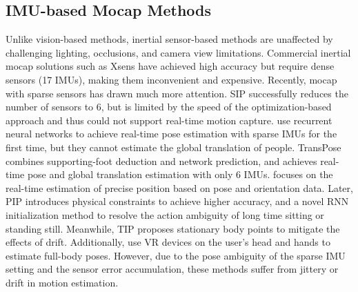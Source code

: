 \documentclass[sigconf,nonacm=true]{acmart}
\begin{document}
\subsection{IMU-based Mocap Methods}
Unlike vision-based methods, inertial sensor-based methods are unaffected by challenging lighting, occlusions, and camera view limitations.  
Commercial inertial mocap solutions such as Xsens \cite{schepers2018xsens} have achieved high accuracy but require dense sensors (17 IMUs), making them inconvenient and expensive.  
Recently, mocap with sparse sensors has drawn much more attention.
SIP \cite{SIP} successfully reduces the number of sensors to 6, but is limited by the speed of the optimization-based approach and thus could not support real-time motion capture.
\cite{DIP, RNN-Ensemble} use recurrent neural networks to achieve real-time pose estimation with sparse IMUs for the first time, but they cannot estimate the global translation of people.  
TransPose \cite{TransPose} combines supporting-foot deduction and network prediction, and achieves real-time pose and global translation estimation with only 6 IMUs.  
\cite{schreiner2021global} focuses on the real-time estimation of precise position based on pose and orientation data.
Later, PIP \cite{PIP} introduces physical constraints \cite{physCap} to achieve higher accuracy, and a novel RNN initialization method to resolve the action ambiguity of long time sitting or standing still.
Meanwhile, TIP \cite{TIP} proposes stationary body points to mitigate the effects of drift.  
Additionally, \cite{jiang2022avatarposer,winkler2022questsim,ye2022neural3points,aliakbarian2022flag} use VR devices on the user's head and hands to estimate full-body poses.
However, due to the pose ambiguity of the sparse IMU setting and the sensor error accumulation, these methods suffer from jittery or drift in motion estimation.
\end{document}
